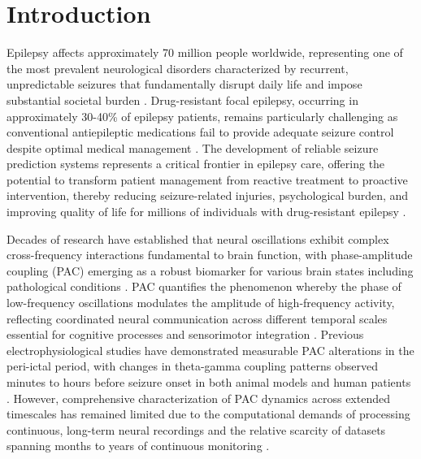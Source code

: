 
\section{Introduction}

Epilepsy affects approximately 70 million people worldwide, representing one of the most prevalent neurological disorders characterized by recurrent, unpredictable seizures that fundamentally disrupt daily life and impose substantial societal burden . Drug-resistant focal epilepsy, occurring in approximately 30-40\% of epilepsy patients, remains particularly challenging as conventional antiepileptic medications fail to provide adequate seizure control despite optimal medical management . The development of reliable seizure prediction systems represents a critical frontier in epilepsy care, offering the potential to transform patient management from reactive treatment to proactive intervention, thereby reducing seizure-related injuries, psychological burden, and improving quality of life for millions of individuals with drug-resistant epilepsy . 

	Decades of research have established that neural oscillations exhibit complex cross-frequency interactions fundamental to brain function, with phase-amplitude coupling (PAC) emerging as a robust biomarker for various brain states including pathological conditions . PAC quantifies the phenomenon whereby the phase of low-frequency oscillations modulates the amplitude of high-frequency activity, reflecting coordinated neural communication across different temporal scales essential for cognitive processes and sensorimotor integration . Previous electrophysiological studies have demonstrated measurable PAC alterations in the peri-ictal period, with changes in theta-gamma coupling patterns observed minutes to hours before seizure onset in both animal models and human patients . However, comprehensive characterization of PAC dynamics across extended timescales has remained limited due to the computational demands of processing continuous, long-term neural recordings and the relative scarcity of datasets spanning months to years of continuous monitoring . 

